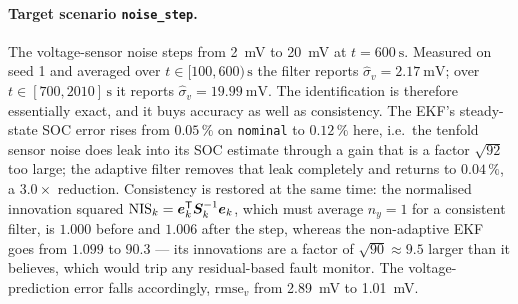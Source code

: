 \paragraph{Target scenario \texttt{noise\_step}.}  The voltage-sensor noise steps from
\SI{2}{\milli\volt} to \SI{20}{\milli\volt} at $t=\SI{600}{\second}$.  Measured on seed 1 and
averaged over $t\in[100,600)\,\si{\second}$ the filter reports
$\hat\sigma_v=\SI{2.17}{\milli\volt}$; over $t\in[700,2010]\,\si{\second}$ it reports
$\hat\sigma_v=\SI{19.99}{\milli\volt}$.  The identification is therefore essentially exact, and it
buys accuracy as well as consistency.  The EKF's steady-state SOC error rises from $0.05\,\%$ on
\texttt{nominal} to $0.12\,\%$ here, i.e.\ the tenfold sensor noise does leak into its SOC estimate
through a gain that is a factor $\sqrt{92}$ too large; the adaptive filter removes that leak
completely and returns to $\mathbf{0.04\,\%}$, a $3.0\times$ reduction.  Consistency is restored at
the same time: the normalised innovation squared $\mathrm{NIS}_k=\bm{e}_k^{\mathsf{T}}\bm{S}_k^{-1}\bm{e}_k$, which
must average $n_y=1$ for a consistent filter, is $1.000$ before and $1.006$ after the step, whereas
the non-adaptive EKF goes from $1.099$ to $\mathbf{90.3}$ --- its innovations are a factor of
$\sqrt{90}\approx9.5$ larger than it believes, which would trip any residual-based fault monitor.
The voltage-prediction error falls accordingly, $\mathrm{rmse}_v$ from \SI{2.89}{\milli\volt} to
\SI{1.01}{\milli\volt}.

